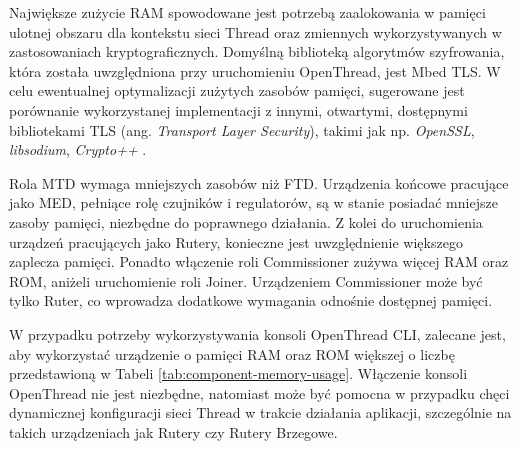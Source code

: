 Największe zużycie RAM spowodowane jest potrzebą zaalokowania w pamięci ulotnej obszaru dla kontekstu sieci Thread oraz zmiennych wykorzystywanych w zastosowaniach kryptograficznych. Domyślną biblioteką algorytmów szyfrowania, która została uwzględniona przy uruchomieniu OpenThread, jest Mbed TLS. W celu ewentualnej optymalizacji zużytych zasobów pamięci, sugerowane jest porównanie wykorzystanej implementacji z innymi, otwartymi, dostępnymi bibliotekami TLS (ang. \textit{Transport Layer Security}), takimi jak np. \textit{OpenSSL}, \textit{libsodium}, \textit{Crypto++} \cite{mbed-tls-alt}. 

Rola MTD wymaga mniejszych zasobów niż FTD. Urządzenia końcowe pracujące jako MED, pełniące rolę czujników i regulatorów, są w stanie posiadać mniejsze zasoby pamięci, niezbędne do poprawnego działania. Z kolei do uruchomienia urządzeń pracujących jako Rutery, konieczne jest uwzględnienie większego zaplecza pamięci. Ponadto włączenie roli Commissioner zużywa więcej RAM oraz ROM, aniżeli uruchomienie roli Joiner. Urządzeniem Commissioner może być tylko Ruter, co wprowadza dodatkowe wymagania odnośnie dostępnej pamięci.

W przypadku potrzeby wykorzystywania konsoli OpenThread CLI, zalecane jest, aby wykorzystać urządzenie o pamięci RAM oraz ROM większej o liczbę przedstawioną w Tabeli \ref{tab:component-memory-usage}. Włączenie konsoli OpenThread nie jest niezbędne, natomiast może być pomocna w przypadku chęci dynamicznej konfiguracji sieci Thread w trakcie działania aplikacji, szczególnie na takich urządzeniach jak Rutery czy Rutery Brzegowe.




